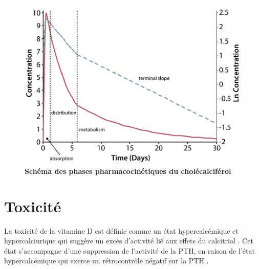 \documentclass[
  a4paper,
  DIV=11,
  numbers=noendperiod,
  listof=totoc]{scrreprt}
\begin{document}
\begin{figure}

{\centering \includegraphics{figures/Schoenmakers.2018 - Plasma appearance and disappearance of 25(OH)D after oral intake.png}

}

\caption[Schéma des phases pharmacocinétiques du
cholécalciférol]{\label{fig-PK-all-VitD}\textbf{Schéma des phases
pharmacocinétiques du cholécalciférol} \autocite{Schoenmakers.2018}}

\end{figure}

\hypertarget{toxicituxe9}{%
\section{Toxicité}\label{toxicituxe9}}

La toxicité de la vitamine D est définie comme un état hypercalcémique
et hypercalciurique qui suggère un excès d'activité lié aux effets du
calcitriol \autocite{Vieth.1990}. Cet état s'accompagne d'une
suppression de l'activité de la \ac{PTH}, en raison de l'état
hypercalcémique qui exerce un rétrocontrôle négatif sur la \ac{PTH}
\autocites[ ]{Marcinowska-Suchowierska.2018}{Dusso.2005}.
\end{document}

